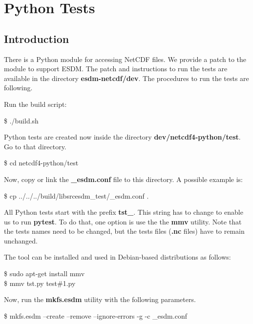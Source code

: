\chapter{Python Tests}
\label{ch:python}

\section{Introduction}


There is a Python module for accessing NetCDF files.
We provide a patch to the module to support ESDM.
The patch and instructions to run the tests are available in the directory \textbf{esdm-netcdf/dev}.
The procedures to run the tests are following.

Run the build script:

\begin{framed}
\$ ./build.sh
\end{framed}

Python tests are created now inside the directory \textbf{dev/netcdf4-python/test}. Go to that directory.

\begin{framed}
\$ cd netcdf4-python/test
\end{framed}

Now, copy or link the \textbf{\_esdm.conf} file to this directory. A possible example is:

\begin{framed}
\$ cp ../../../build/libsrcesdm\_test/\_esdm.conf .
\end{framed}

All Python tests start with the prefix \textbf{tst\_}.
This string has to change to enable us to run \textbf{pytest}. To do that, one option is use the the \textbf{mmv} utility. Note that the tests names need to be changed, but the tests files (\textbf{.nc} files) have to remain unchanged.

The tool can be installed and used in Debian-based distributions as follows:

\begin{framed}
\$ sudo apt-get install mmv\\
\$ mmv tst\*.py test\#1.py
\end{framed}

Now, run the \textbf{mkfs.esdm} utility with the following parameters.

\begin{framed}
\$ mkfs.esdm --create --remove --ignore-errors -g -c \_esdm.conf
\end{framed}

